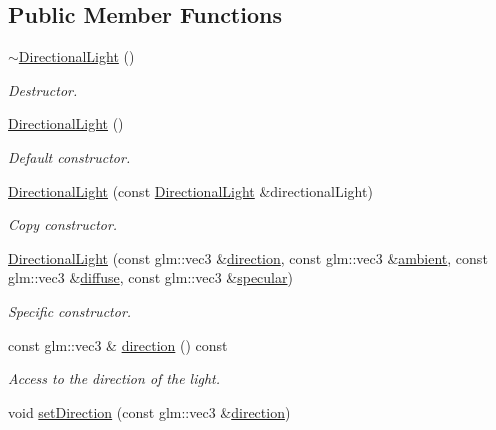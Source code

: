 \subsection*{Public Member Functions}
\begin{DoxyCompactItemize}
\item 
\hyperlink{classDirectionalLight_ac4aca6c806e752c65ffea9b2f237b245}{$\sim$\+Directional\+Light} ()
\begin{DoxyCompactList}\small\item\em Destructor. \end{DoxyCompactList}\item 
\hyperlink{classDirectionalLight_a949b877ae041b9818f47eb812d80fa1b}{Directional\+Light} ()
\begin{DoxyCompactList}\small\item\em Default constructor. \end{DoxyCompactList}\item 
\hyperlink{classDirectionalLight_aa2f0352247094325d9496a7883fc7ba4}{Directional\+Light} (const \hyperlink{classDirectionalLight}{Directional\+Light} \&directional\+Light)
\begin{DoxyCompactList}\small\item\em Copy constructor. \end{DoxyCompactList}\item 
\hyperlink{classDirectionalLight_a27bae6211ab086bd175291e8de5c6c2b}{Directional\+Light} (const glm\+::vec3 \&\hyperlink{classDirectionalLight_a62bcb380d9e81abc20185b990ef35ec8}{direction}, const glm\+::vec3 \&\hyperlink{classDirectionalLight_a348fa5150e5959b26411715b6ba1bff2}{ambient}, const glm\+::vec3 \&\hyperlink{classDirectionalLight_ab0314fdc6fb9722f4bf17c198df348f9}{diffuse}, const glm\+::vec3 \&\hyperlink{classDirectionalLight_a46773cdc52f5a93e05c25a1742257312}{specular})
\begin{DoxyCompactList}\small\item\em Specific constructor. \end{DoxyCompactList}\item 
const glm\+::vec3 \& \hyperlink{classDirectionalLight_a62bcb380d9e81abc20185b990ef35ec8}{direction} () const 
\begin{DoxyCompactList}\small\item\em Access to the direction of the light. \end{DoxyCompactList}\item 
void \hyperlink{classDirectionalLight_a48a2fca768a442accf005ffa8e2917d8}{set\+Direction} (const glm\+::vec3 \&\hyperlink{classDirectionalLight_a62bcb380d9e81abc20185b990ef35ec8}{direction})

\end{DoxyCompactItemize}
